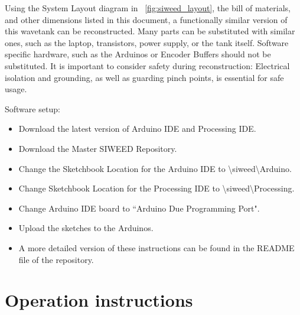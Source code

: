 \documentclass[11pt, letterpaper]{article}
\begin{document}
Using the System Layout diagram in \figurename~\ref{fig:siweed_layout}, the bill of materials, and other dimensions listed in this document, a functionally similar version of this wavetank can be reconstructed.
Many parts can be substituted with similar ones, such as the laptop, transistors, power supply, or the tank itself.
Software specific hardware, such as the Arduinos or Encoder Buffers should not be substituted. 
It is important to consider safety during reconstruction: Electrical isolation and grounding, as well as guarding pinch points, is essential for safe usage.


Software setup:
\begin{itemize}
\item Download the latest version of Arduino IDE and Processing IDE.
\item Download the Master SIWEED Repository.
\item Change the Sketchbook Location for the Arduino IDE to \textbackslash siweed\textbackslash Arduino.
\item Change Sketchbook Location for the Processing IDE to \textbackslash siweed\textbackslash Processing.
\item Change Arduino IDE board to ``Arduino Due Programming Port".
\item Upload the sketches to the Arduinos.
\item A more detailed version of these instructions can be found in the README file of the repository.
\end{itemize}

\section{Operation instructions}
\end{document}
